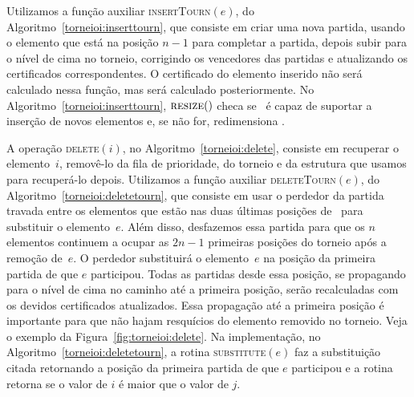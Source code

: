 

Utilizamos a função auxiliar \textsc{insertTourn}$(e)$, do Algoritmo~\ref{torneioi:inserttourn},
que consiste em criar uma nova partida, usando o elemento que está na posição $n-1$ para completar
a partida, depois subir para o nível de cima no torneio, corrigindo os vencedores das partidas e
atualizando os certificados correspondentes.
O certificado do elemento inserido não será calculado nessa função, mas será calculado
posteriormente.
No Algoritmo~\ref{torneioi:inserttourn}, $\textsc{resize}()$ checa se \torneio~é capaz de suportar
a inserção de novos elementos e, se não for, redimensiona \torneio.





A operação \textsc{delete}$(i)$, no Algoritmo~\ref{torneioi:delete}, consiste em recuperar o
elemento~$i$, removê-lo da fila de prioridade, do torneio e da estrutura que usamos para
recuperá-lo depois.
Utilizamos a função auxiliar \textsc{deleteTourn}$(e)$, do Algoritmo~\ref{torneioi:deletetourn},
que consiste em usar o perdedor da partida travada entre os elementos que estão nas duas últimas
posições de \torneio~para substituir o elemento~$e$.
Além disso, desfazemos essa partida para que os $n$ elementos continuem a ocupar as $2n - 1$
primeiras posições do torneio após a remoção de~$e$.
O perdedor substituirá o elemento~$e$ na posição da primeira partida de que $e$ participou.
Todas as partidas desde essa posição, se propagando para o nível de cima no caminho até a primeira
posição, serão recalculadas com os devidos certificados atualizados.
Essa propagação até a primeira posição é importante para que não hajam resquícios do elemento
removido no torneio.
Veja o exemplo da Figura~\ref{fig:torneioi:delete}.
Na implementação, no Algoritmo~\ref{torneioi:deletetourn}, a rotina \textsc{substitute}$(e)$ faz a
substituição citada retornando a posição da primeira partida de que $e$ participou e a rotina
 retorna se o valor de $i$ é maior que o valor de $j$.




